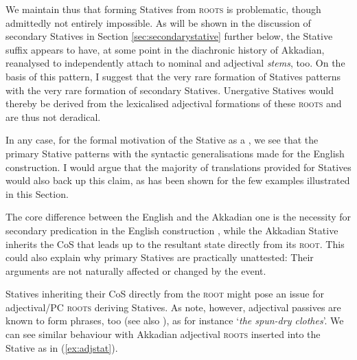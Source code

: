 \documentclass[output=paper,colorlinks,citecolor=brown]{langscibook}
\begin{document}
 We maintain thus that forming Statives from  \textsc{roots} is problematic, though admittedly not entirely impossible. As will be shown in the discussion of secondary Statives in Section \ref{sec:secondarystative} further below, the Stative suffix appears to have, at some point in the diachronic history of Akkadian, reanalysed to independently attach to nominal and adjectival \textit{stems}, too. On the basis of this pattern, I suggest that the very rare formation of  Statives patterns with the very rare formation of secondary Statives. Unergative Statives would thereby be derived from the lexicalised adjectival formations of these \textsc{roots} and are thus not deradical.


In any case, for the formal motivation of the Stative as a , we see that the primary Stative patterns with the syntactic generalisations made for the English  construction. I would argue that the majority of translations provided for Statives would also back up this claim, as has been shown for the few examples illustrated in this Section. 

The core difference between the English  and the Akkadian one is the necessity for secondary predication in the English construction \citep[54]{LevinRappaport1995}, while the Akkadian Stative inherits the CoS  that leads up to the resultant state directly from its \textsc{root}.  This could also explain why primary   Statives are practically unattested: Their arguments are not naturally affected or changed by the event.

Statives inheriting their CoS  directly from the \textsc{root} might pose an issue for adjectival/PC \textsc{roots}  deriving Statives. As \citet[40]{LevinRappaport1995} note, however, adjectival passives are known to form  phrases, too (see also \cite{Keyser1984,roberts_representation_1987,stroik_middles_1992}), as for instance `\textit{the spun-dry clothes}'. We can see similar behaviour with Akkadian adjectival \textsc{roots}  inserted into the Stative as in (\ref{ex:adjstat}).
\end{document}
